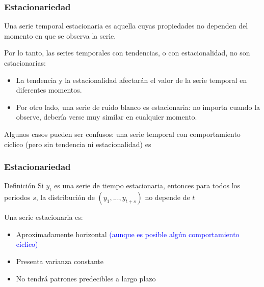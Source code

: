 \documentclass[10pt]{beamer}
\begin{document}



\begin{frame}[fragile]
\frametitle{Estacionariedad}

Una serie temporal estacionaria es aquella cuyas propiedades no dependen del momento en que se observa la serie.

\vspace{3mm}


Por lo tanto, las series temporales con tendencias, o con estacionalidad, no son estacionarias: 

\begin{itemize}
\item La tendencia y la estacionalidad afectarán el valor de la serie temporal en diferentes momentos. 
\item Por otro lado, una serie de ruido blanco es estacionaria: no importa cuando la observe, debería verse muy similar en cualquier momento.
\end{itemize}

\vspace{3mm}
\pause

Algunos casos pueden ser confusos: una serie temporal con comportamiento cíclico (pero sin tendencia ni estacionalidad) es 


\end{frame}






\begin{frame}
\frametitle{Estacionariedad}


\begin{block}{Definición}
Si $y_t$ es una serie de tiempo estacionaria, entonces para todos los periodos $s$, la distribución de $(y_1, ..., y_{t+s})$ no depende de $t$
\end{block}

\vspace{4mm}

Una serie estacionaria es:
\begin{itemize}
\item Aproximadamente horizontal \small{\textcolor{blue}{(aunque es posible algún comportamiento cíclico)}}
\item Presenta varianza constante
\item No tendrá patrones predecibles a largo plazo
\end{itemize}


\end{frame}
\end{document}
